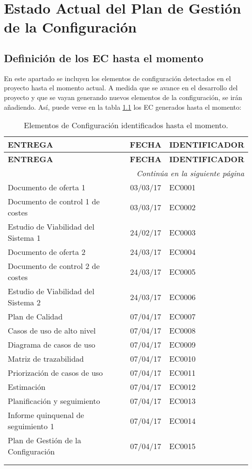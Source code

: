 \chapter{Estado Actual del Plan de Gestión de la Configuración}
\section{Definición de los EC hasta el momento}
\par En este apartado se incluyen los elementos de configuración detectados en el proyecto hasta el momento actual. A medida que se avance en el desarrollo del proyecto y que se vayan generando nuevos elementos de la configuración, se irán añadiendo. Así, puede verse en la tabla \ref{tab:ECactuales} los EC generados hasta el momento:

\begin{center}
\begin{longtable}{l c l}

\textbf{ENTREGA} & \textbf{FECHA} & \textbf{IDENTIFICADOR} \\\hline \hline
\endfirsthead
\textbf{ENTREGA} & \textbf{FECHA} & \textbf{IDENTIFICADOR} \\\hline \hline
\endhead

\hline \multicolumn{3}{r}{\textit{Continúa en la siguiente página}} \\
\endfoot
\endlastfoot

\label{EC:0001}Documento de oferta 1 & 03/03/17 & EC0001\\
\label{EC:0002}Documento de control 1 de costes & 03/03/17 & EC0002\\
\label{EC:0003}Estudio de Viabilidad del Sistema 1 & 24/02/17 & EC0003\\
\label{EC:0004}Documento de oferta 2 & 24/03/17 & EC0004\\
\label{EC:0005}Documento de control 2 de costes & 24/03/17 & EC0005\\
\label{EC:0006}Estudio de Viabilidad del Sistema 2 & 24/03/17 & EC0006\\
\label{EC:0007}Plan de Calidad & 07/04/17 & EC0007\\
\label{EC:0008}Casos de uso de alto nivel & 07/04/17 & EC0008\\
\label{EC:0009}Diagrama de casos de uso & 07/04/17 & EC0009\\
\label{EC:0010}Matriz de trazabilidad & 07/04/17 & EC0010\\
\label{EC:0011}Priorización de casos de uso & 07/04/17 & EC0011\\
\label{EC:0012}Estimación & 07/04/17 & EC0012\\
\label{EC:0013}Planificación y seguimiento & 07/04/17 & EC0013\\
\label{EC:0014}Informe quinquenal de seguimiento 1 & 07/04/17 & EC0014\\
\label{EC:0015}Plan de Gestión de la Configuración & 07/04/17 & EC0015\\\hline

\caption{Elementos de Configuración identificados hasta el momento.}\\
\label{tab:ECactuales}
\end{longtable}
\end{center}



